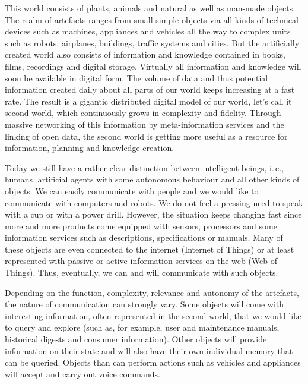 \documentclass[10pt, plain]{../../metanetpaper}
\begin{document}
\begin{multicols}{2}
This world consists of plants, animals and natural as well as man-made objects. The realm of artefacts ranges from small simple objects via all kinds of technical devices such as machines, appliances and vehicles all the way to complex units such as robots, airplanes, buildings, traffic systems and cities. But the artificially created world also consists of information and knowledge contained in books, films, recordings and digital storage. Virtually all information and knowledge will soon be available in digital form. The volume of data and thus potential information created daily about all parts of our world keeps increasing at a fast rate. The result is a gigantic distributed digital model of our world, let’s call it second world, which continuously grows in complexity and fidelity. Through massive networking of this information by meta-information services and the linking of open data, the second world is getting more useful as a resource for information, planning and knowledge creation. 
 
Today we still have a rather clear distinction between intelligent beings, i.\,e., humans, artificial agents with some autonomous behaviour and all other kinds of objects. We can easily communicate with people and we would like to communicate with computers and robots. We do not feel a pressing need to speak with a cup or with a power drill. However, the situation keeps changing fast since more and more products come equipped with sensors, processors and some information services such as descriptions, specifications or manuals. Many of these objects are even connected to the internet (Internet of Things) or at least represented with passive or active information services on the web (Web of Things). Thus, eventually, we can and will communicate with such objects.
 
Depending on the function, complexity, relevance and autonomy of the artefacts, the nature of communication can strongly vary. Some objects will come with interesting information, often represented in the second world, that we would like to query and explore (such as, for example, user and maintenance manuals, historical digests and consumer information). Other objects will provide information on their state and will also have their own individual memory that can be queried. Objects than can perform actions such as vehicles and appliances will accept and carry out voice commands. 
 
 

\end{multicols}
\end{document}
